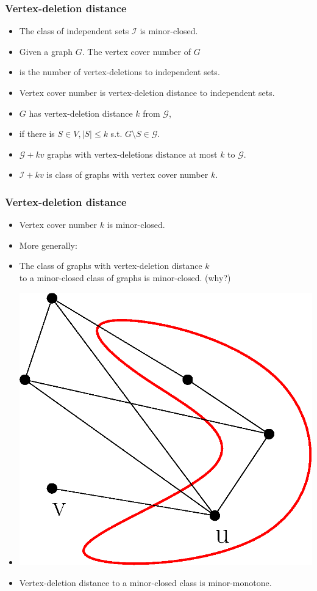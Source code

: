 \documentclass[t,usenames,dvipsnames]{beamer}
\begin{document}
\begin{frame}\frametitle{Vertex-deletion distance}
	\begin{itemize}[<+->]
		\item The class of independent sets $\mathcal{I}$ is minor-closed.
		\item Given a graph $G$. The vertex cover number of $G$
		\item[] \hspace{1cm} is the number of vertex-deletions to independent sets.
		\item Vertex cover number is vertex-deletion distance to independent sets.
		\item $G$ has vertex-deletion distance $k$ from $\mathcal{G}$,
		\item[] \hspace{1cm} if there is $S \in V, |S| \leq k$ s.t. $G \setminus S \in
			\mathcal{G}$.
		\item $\mathcal{G} + k v$ graphs with vertex-deletions distance at most $k$ to
			$\mathcal{G}$.
		\item $\mathcal{I} + k v$ is class of graphs with vertex cover number $k$.
	\end{itemize}
\end{frame}
\begin{frame}\frametitle{Vertex-deletion distance}
	\begin{itemize}[<+->]
		\item Vertex cover number $k$ is minor-closed.
		\item More generally:
		\item[] The class of graphs with vertex-deletion distance $k$\\
			to a minor-closed class of graphs is minor-closed. (why?)
		\item[]\centering \includegraphics[width=.4\linewidth]{minor-closed.eps}
		\item Vertex-deletion distance to a minor-closed class is minor-monotone.
	\end{itemize}
\end{frame}
\end{document}
